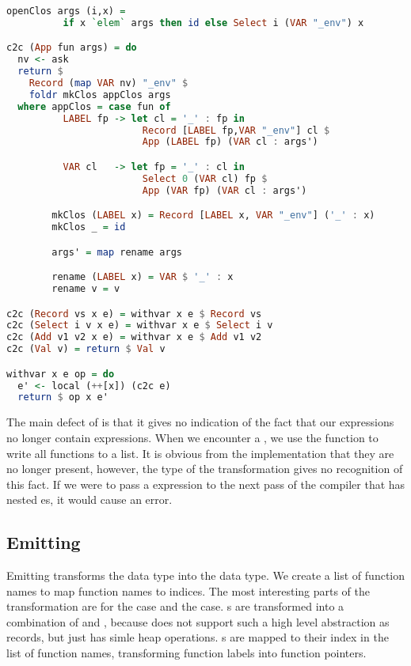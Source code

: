 {\begin{lstlisting}[language=Haskell]
        openClos args (i,x) =
          if x `elem` args then id else Select i (VAR "_env") x

c2c (App fun args) = do
  nv <- ask
  return $
    Record (map VAR nv) "_env" $
    foldr mkClos appClos args
  where appClos = case fun of
          LABEL fp -> let cl = '_' : fp in
                        Record [LABEL fp,VAR "_env"] cl $
                        App (LABEL fp) (VAR cl : args')

          VAR cl   -> let fp = '_' : cl in
                        Select 0 (VAR cl) fp $
                        App (VAR fp) (VAR cl : args')

        mkClos (LABEL x) = Record [LABEL x, VAR "_env"] ('_' : x)
        mkClos _ = id

        args' = map rename args

        rename (LABEL x) = VAR $ '_' : x
        rename v = v

c2c (Record vs x e) = withvar x e $ Record vs
c2c (Select i v x e) = withvar x e $ Select i v
c2c (Add v1 v2 x e) = withvar x e $ Add v1 v2
c2c (Val v) = return $ Val v

withvar x e op = do
  e' <- local (++[x]) (c2c e)
  return $ op x e'
\end{lstlisting}

The main defect of  is that it gives no indication of the fact that our  expressions no longer contain  expressions. When we encounter a , we use the  function to write all functions to a list. It is obvious from the implementation that they are no longer present, however, the type  of the transformation gives no recognition of this fact. If we were to pass a  expression to the next pass of the compiler that has nested es, it would cause an error.

\subsection{\label{section:emit}Emitting}
Emitting transforms the  data type into the  data type. We create a list of function names  to map function names to indices. The most interesting parts of the transformation are for the  case and the  case. s are transformed into a combination of  and , because  does not support such a high level abstraction as records, but just has simle heap operations. s are mapped to their index in the list of function names, transforming function labels into function pointers.

}
